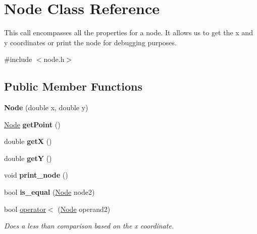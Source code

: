 \hypertarget{classNode}{}\section{Node Class Reference}
\label{classNode}


This call encompasses all the properties for a node. It allows us to get the x and y coordinates or print the node for debugging purposes.  




{\ttfamily \#include $<$node.\+h$>$}

\subsection*{Public Member Functions}
\begin{DoxyCompactItemize}
\item 
\mbox{\label{classNode_ab488e53f2acfc84ef0cacc1951f92c3d}} 
{\bfseries Node} (double x, double y)
\item 
\mbox{\label{classNode_a667cd139237fd82f1d4d6e784310c42d}} 
\hyperlink{classNode}{Node} {\bfseries get\+Point} ()
\item 
\mbox{\label{classNode_a8d8ccf6a6da7717ea6aa67e52c7c9017}} 
double {\bfseries getX} ()
\item 
\mbox{\label{classNode_a8877121bf44537ccbe2f3c441fa3b664}} 
double {\bfseries getY} ()
\item 
\mbox{\label{classNode_aaad9d5a79f3819ba7e2ddd2b196d300f}} 
void {\bfseries print\+\_\+node} ()
\item 
\mbox{\label{classNode_aa93a3a9846c909197ba00bfd6fb4a549}} 
bool {\bfseries is\+\_\+equal} (\hyperlink{classNode}{Node} node2)
\item 
bool \hyperlink{classNode_ab0452101dad47b23bad5419963d85648}{operator$<$} (\hyperlink{classNode}{Node} operand2)
\begin{DoxyCompactList}\small\item\em Does a less than comparison based on the x coordinate. \end{DoxyCompactList}\item 
\mbox{\label{classNode_affe7b2f79e4364a4a37937a9b6e48861}} 

\end{DoxyCompactItemize}
